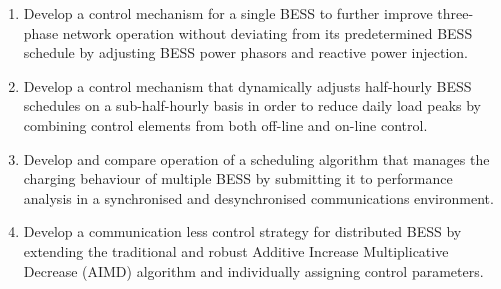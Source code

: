 \begin{enumerate}[
labelindent=*,
style=multiline,
leftmargin=*,
label=\textbf{Objective~\arabic*}
]
	\item \label{objective-1} Develop a control mechanism for a single BESS to further improve three-phase network operation without deviating from its predetermined BESS schedule by adjusting BESS power phasors and reactive power injection.
	\item \label{objective-2} Develop a control mechanism that dynamically adjusts half-hourly BESS schedules on a sub-half-hourly basis in order to reduce daily load peaks by combining control elements from both off-line and on-line control.
	\item \label{objective-3} Develop and compare operation of a scheduling algorithm that manages the charging behaviour of multiple BESS by submitting it to performance analysis in a synchronised and desynchronised communications environment.
	\item \label{objective-4} Develop a communication less control strategy for distributed BESS by extending the traditional and robust Additive Increase Multiplicative Decrease (AIMD) algorithm and individually assigning control parameters.
\end{enumerate}

